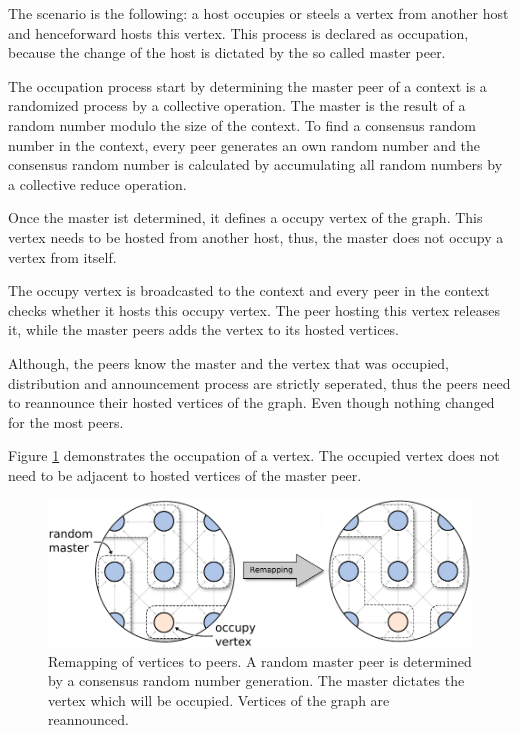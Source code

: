 The scenario is the following: a host occupies or steels a vertex
from another host and henceforward hosts this vertex.  This process
is declared as occupation, because the change of the host is
dictated by the so called master peer.

The occupation process start by determining the master peer of a
context is a randomized process by a collective operation. The
master is the result of a random number modulo the size of the
context. To find a consensus random number in the context, every
peer generates an own random number and the consensus random number
is calculated by accumulating all random numbers by a collective
reduce operation.

Once the master ist determined, it defines a occupy vertex of the
graph. This vertex needs to be hosted from another host, thus,
the master does not occupy a vertex from itself.

The occupy vertex is broadcasted to the context and every peer in
the context checks whether it hosts this occupy vertex. The peer
hosting this vertex releases it, while the master peers adds the vertex
to its hosted vertices.

Although, the peers know the master and the vertex that was
occupied, distribution and announcement process are strictly
seperated, thus the peers need to reannounce their hosted vertices
of the graph. Even though nothing changed for the most peers.


Figure \ref{fig:gol_remapping} demonstrates the occupation of a vertex.
The occupied vertex does not need to be adjacent to hosted vertices
  of the master peer.

  \begin{figure}[H]
    \centering
    \includegraphics[width=\textwidth]{graphics/40_gol_remapping}
    \caption{Remapping of vertices to peers. A random master peer is
      determined by a consensus random number generation. The master
      dictates the vertex which will be occupied. Vertices of the
      graph are reannounced.}
    \label{fig:gol_remapping}
  \end{figure}


